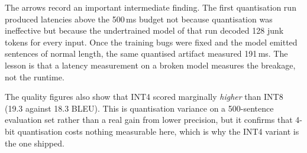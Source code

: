 The arrows record an important intermediate finding. The first quantisation run
produced latencies above the 500\,ms budget not because quantisation was
ineffective but because the undertrained model of that run decoded 128 junk
tokens for every input. Once the training bugs were fixed and the model emitted
sentences of normal length, the same quantised artifact measured 191\,ms. The
lesson is that a latency measurement on a broken model measures the breakage,
not the runtime.

The quality figures also show that INT4 scored marginally \emph{higher} than
INT8 (19.3 against 18.3 BLEU). This is quantisation variance on a
500-sentence evaluation set rather than a real gain from lower precision, but it
confirms that 4-bit quantisation costs nothing measurable here, which is why the
INT4 variant is the one shipped.
